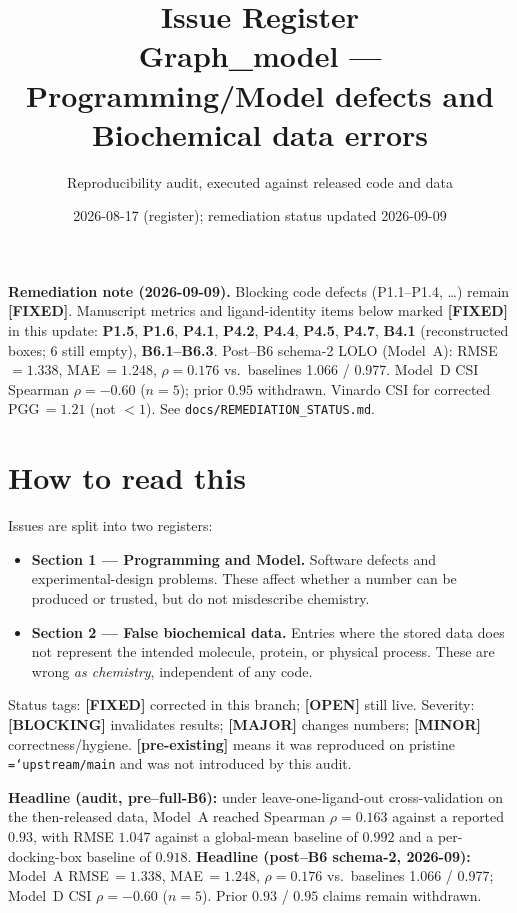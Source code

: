 \documentclass[11pt,a4paper]{article}
\title{Issue Register\\
       \large Graph\_model --- Programming/Model defects and Biochemical data errors}
\author{Reproducibility audit, executed against released code and data}
\date{2026-08-17 (register); remediation status updated 2026-09-09}
\newcommand{\ok}[1]{\textcolor{okgreen}{#1}}
\newcommand{\bad}[1]{\textcolor{badred}{#1}}
\newcommand{\warn}[1]{\textcolor{warnamber}{#1}}
\newcommand{\code}[1]{\texttt{\small\hyphenchar\font=`\-\relax #1}}
\newcommand{\SBLOCK}{\bad{\textbf{[BLOCKING]}}}
\newcommand{\SMAJOR}{\warn{\textbf{[MAJOR]}}}
\newcommand{\SMINOR}{\textbf{[MINOR]}}
\newcommand{\SFIXED}{\ok{\textbf{[FIXED]}}}
\newcommand{\SOPEN}{\bad{\textbf{[OPEN]}}}
\begin{document}
\sloppy
\maketitle

\noindent\textbf{Remediation note (2026-09-09).}
Blocking code defects (P1.1--P1.4, \ldots) remain \SFIXED{}.
Manuscript metrics and ligand-identity items below marked
\SFIXED{} in this update: \textbf{P1.5}, \textbf{P1.6}, \textbf{P4.1},
\textbf{P4.2}, \textbf{P4.4}, \textbf{P4.5}, \textbf{P4.7}, \textbf{B4.1}
(reconstructed boxes; 6 still empty), \textbf{B6.1--B6.3}.
Post--B6 schema-2 LOLO (Model~A): RMSE\,$= 1.338$, MAE\,$= 1.248$,
$\rho = 0.176$ vs.\ baselines 1.066 / 0.977.
Model~D CSI Spearman $\rho = -0.60$ ($n{=}5$); prior $0.95$ withdrawn.
Vinardo CSI for corrected PGG\,$= 1.21$ (not $< 1$).
See \texttt{docs/REMEDIATION\_STATUS.md}.

\section*{How to read this}

Issues are split into two registers:

\begin{itemize}\itemsep2pt
  \item \textbf{Section 1 --- Programming and Model.} Software defects and
        experimental-design problems. These affect whether a number can be
        produced or trusted, but do not misdescribe chemistry.
  \item \textbf{Section 2 --- False biochemical data.} Entries where the
        stored data does not represent the intended molecule, protein, or
        physical process. These are wrong \emph{as chemistry}, independent of
        any code.
\end{itemize}

Status tags: \SFIXED{} corrected in this branch; \SOPEN{} still live.
Severity: \SBLOCK{} invalidates results; \SMAJOR{} changes numbers;
\SMINOR{} correctness/hygiene. \textbf{[pre-existing]} means it was
reproduced on pristine \code{upstream/main} and was not introduced by
this audit.

\vspace{4pt}\noindent
\textbf{Headline (audit, pre--full-B6):} under leave-one-ligand-out
cross-validation on the then-released data, Model~A reached Spearman
$\rho = 0.163$ against a reported $0.93$, with RMSE $1.047$ against a
global-mean baseline of $0.992$ and a per-docking-box baseline of $0.918$.
\textbf{Headline (post--B6 schema-2, 2026-09):} Model~A RMSE\,$= 1.338$,
MAE\,$= 1.248$, $\rho = 0.176$ vs.\ baselines 1.066 / 0.977;
Model~D CSI $\rho = -0.60$ ($n{=}5$). Prior $0.93$ / $0.95$ claims
remain withdrawn.
\end{document}
